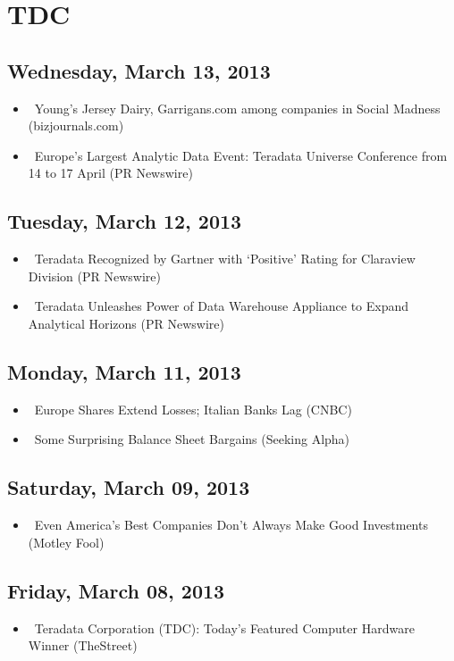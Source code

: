 \documentclass[11pt,asymmetric]{article}
\begin{document}
\section*{TDC}

\subsection*{Wednesday, March 13, 2013}
\begin{itemize}
\item\ Young's Jersey Dairy, Garrigans.com among companies in Social Madness (bizjournals.com)
\item\ Europe's Largest Analytic Data Event: Teradata Universe Conference from 14 to 17 April (PR Newswire)
\end{itemize}
\subsection*{Tuesday, March 12, 2013}
\begin{itemize}
\item\ Teradata Recognized by Gartner with `Positive' Rating for Claraview Division (PR Newswire)
\item\ Teradata Unleashes Power of Data Warehouse Appliance to Expand Analytical Horizons (PR Newswire)
\end{itemize}
\subsection*{Monday, March 11, 2013}
\begin{itemize}
\item\ Europe Shares Extend Losses; Italian Banks Lag (CNBC)
\item\ Some Surprising Balance Sheet Bargains (Seeking Alpha)
\end{itemize}
\subsection*{Saturday, March 09, 2013}
\begin{itemize}
\item\ Even America's Best Companies Don't Always Make Good Investments (Motley Fool)
\end{itemize}
\subsection*{Friday, March 08, 2013}
\begin{itemize}
\item\ Teradata Corporation (TDC): Today's Featured Computer Hardware Winner (TheStreet)
\end{itemize}
\end{document}
